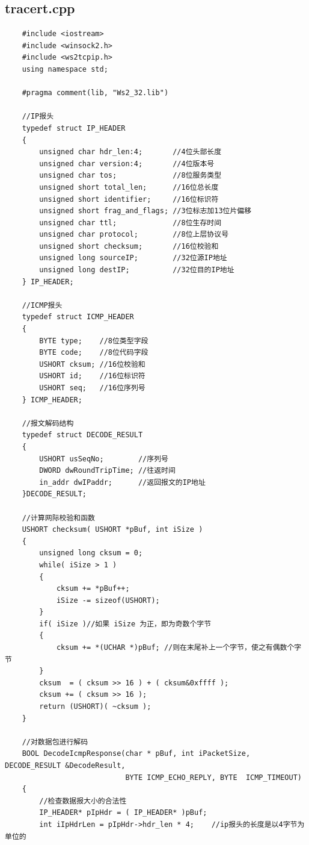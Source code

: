 \documentclass[a4paper,UTF8]{article}
\begin{document}
\subsection{tracert.cpp}
\begin{lstlisting}
    #include <iostream>
    #include <winsock2.h>       
    #include <ws2tcpip.h>
    using namespace std;

    #pragma comment(lib, "Ws2_32.lib")

    //IP报头
    typedef struct IP_HEADER
    {
        unsigned char hdr_len:4;       //4位头部长度
        unsigned char version:4;       //4位版本号
        unsigned char tos;             //8位服务类型
        unsigned short total_len;      //16位总长度
        unsigned short identifier;     //16位标识符
        unsigned short frag_and_flags; //3位标志加13位片偏移
        unsigned char ttl;             //8位生存时间
        unsigned char protocol;        //8位上层协议号
        unsigned short checksum;       //16位校验和
        unsigned long sourceIP;        //32位源IP地址
        unsigned long destIP;          //32位目的IP地址
    } IP_HEADER;

    //ICMP报头
    typedef struct ICMP_HEADER
    {
        BYTE type;    //8位类型字段
        BYTE code;    //8位代码字段
        USHORT cksum; //16位校验和
        USHORT id;    //16位标识符
        USHORT seq;   //16位序列号
    } ICMP_HEADER;

    //报文解码结构
    typedef struct DECODE_RESULT
    {
        USHORT usSeqNo;        //序列号
        DWORD dwRoundTripTime; //往返时间
        in_addr dwIPaddr;      //返回报文的IP地址
    }DECODE_RESULT;

    //计算网际校验和函数
    USHORT checksum( USHORT *pBuf, int iSize )
    {
        unsigned long cksum = 0;
        while( iSize > 1 )
        {
            cksum += *pBuf++;
            iSize -= sizeof(USHORT);
        }
        if( iSize )//如果 iSize 为正，即为奇数个字节
        {
            cksum += *(UCHAR *)pBuf; //则在末尾补上一个字节，使之有偶数个字节
        }
        cksum  = ( cksum >> 16 ) + ( cksum&0xffff );
        cksum += ( cksum >> 16 );
        return (USHORT)( ~cksum );
    }

    //对数据包进行解码
    BOOL DecodeIcmpResponse(char * pBuf, int iPacketSize, DECODE_RESULT &DecodeResult,
                            BYTE ICMP_ECHO_REPLY, BYTE  ICMP_TIMEOUT)
    {
        //检查数据报大小的合法性
        IP_HEADER* pIpHdr = ( IP_HEADER* )pBuf;
        int iIpHdrLen = pIpHdr->hdr_len * 4;    //ip报头的长度是以4字节为单位的


\end{lstlisting}
\end{document}

